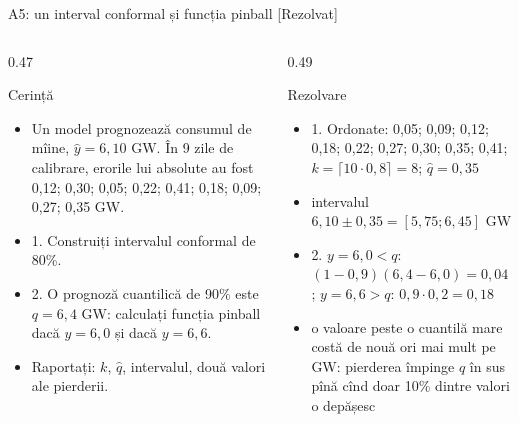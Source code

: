 \begin{frame}{A5: un interval conformal și funcția pinball [Rezolvat]}
\itemsize{\scriptsize}
\begin{columns}[T]
\begin{column}{0.47\textwidth}
\begin{block}{Cerință}
\begin{itemize}
    \item Un model prognozează consumul de mîine, $\hat y = 6{,}10$ GW. În 9 zile de calibrare, erorile lui absolute au fost 0,12; 0,30; 0,05; 0,22; 0,41; 0,18; 0,09; 0,27; 0,35 GW.
    \item 1. Construiți intervalul conformal de 80\%.
    \item 2. O prognoză cuantilică de 90\% este $q = 6{,}4$ GW: calculați funcția pinball dacă $y = 6{,}0$ și dacă $y = 6{,}6$.
    \item Raportați: $k$, $\hat q$, intervalul, două valori ale pierderii.
\end{itemize}
\end{block}
\end{column}
\begin{column}{0.49\textwidth}
\begin{exampleblock}{Rezolvare}
\begin{itemize}
    \item 1. Ordonate: 0{,}05; 0{,}09; 0{,}12; 0{,}18; 0{,}22; 0{,}27; 0{,}30; 0{,}35; 0{,}41; $k = \lceil 10 \cdot 0{,}8 \rceil = 8$; $\hat q = 0{,}35$
    \item intervalul $6{,}10 \pm 0{,}35 = [5{,}75; 6{,}45]$ GW
    \item 2. $y = 6{,}0 < q$: $(1 - 0{,}9)(6{,}4 - 6{,}0) = 0{,}04$; $y = 6{,}6 > q$: $0{,}9 \cdot 0{,}2 = 0{,}18$
    \item o valoare peste o cuantilă mare costă de nouă ori mai mult pe GW: pierderea împinge $q$ în sus pînă cînd doar 10\% dintre valori o depășesc
\end{itemize}
\end{exampleblock}
\end{column}
\end{columns}
\end{frame}

